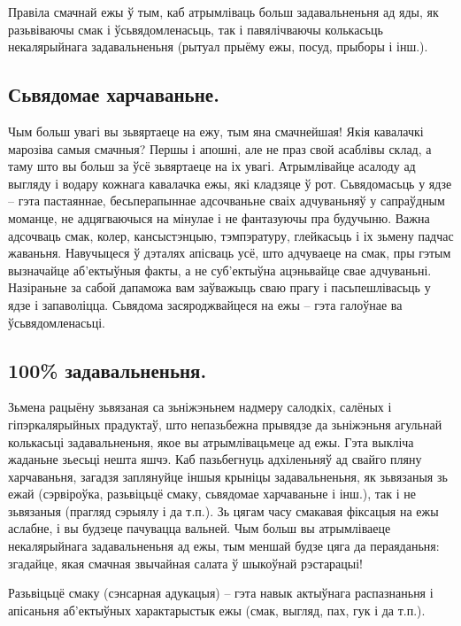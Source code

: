 Правіла смачнай ежы ў тым, каб атрымліваць больш задавальненьня ад яды, як разьвіваючы смак і ўсьвядомленасьць, так і павялічваючы колькасьць некалярыйнага задавальненьня (рытуал прыёму ежы, посуд, прыборы і інш.).

\subsection{Сьвядомае харчаваньне.}
Чым больш увагі вы зьвяртаеце на ежу, тым яна смачнейшая! Якія кавалачкі марозіва самыя смачныя? Першы і апошні, але не праз свой асаблівы склад, а таму што вы больш за ўсё зьвяртаеце на іх увагі. Атрымлівайце асалоду ад выгляду і водару кожнага кавалачка ежы, які кладзяце ў рот. Сьвядомасьць у ядзе – гэта пастаяннае, бесьперапыннае адсочваньне сваіх адчуваньняў у сапраўдным моманце, не адцягваючыся на мінулае і не фантазуючы пра будучыню. Важна адсочваць смак, колер, кансыстэнцыю, тэмпэратуру, глейкасьць і іх зьмену падчас жаваньня. Навучыцеся ў дэталях апісваць усё, што адчуваеце на смак, пры гэтым вызначайце аб'ектыўныя факты, а не суб'ектыўна ацэньвайце свае адчуваньні. Назіраньне за сабой дапаможа вам заўважыць сваю прагу і пасьпешлівасьць у ядзе і запаволіцца. Сьвядома засяроджвайцеся на ежы – гэта галоўнае ва ўсьвядомленасьці.

\subsection{100\% задавальненьня.}
Зьмена рацыёну зьвязаная са зьніжэньнем надмеру салодкіх, салёных і гіпэркалярыйных прадуктаў, што непазьбежна прывядзе да зьніжэньня агульнай колькасьці задавальненьня, якое вы атрымлівацьмеце ад ежы. Гэта выкліча жаданьне зьесьці нешта яшчэ. Каб пазьбегнуць адхіленьняў ад свайго пляну харчаваньня, загадзя заплянуйце іншыя крыніцы задавальненьня, як зьвязаныя зь ежай (сэрвіроўка, разьвіцьцё смаку, сьвядомае харчаваньне і інш.), так і не зьвязаныя (прагляд сэрыялу і да т.п.). Зь цягам часу смакавая фіксацыя на ежы аслабне, і вы будзеце пачувацца вальней. Чым больш вы атрымліваеце некалярыйнага задавальненьня ад ежы, тым меншай будзе цяга да пераяданьня: згадайце, якая смачная звычайная салата ў шыкоўнай рэстарацыі!

Разьвіцьцё смаку (сэнсарная адукацыя) – гэта навык актыўнага распазнаньня і апісаньня аб'ектыўных характарыстык ежы (смак, выгляд, пах, гук і да т.п.).


